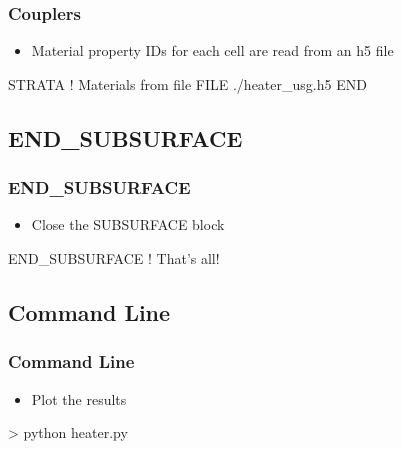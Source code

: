 \documentclass{beamer}
\newcommand\bluecomment[1]{{{\color{blue} #1}}}
\begin{document}
\begin{frame}[fragile]\frametitle{Couplers}
\begin{itemize}
  \item{Material property IDs for each cell are read from an h5 file}
\end{itemize}

\begin{semiverbatim}
STRATA \bluecomment{! Materials from file}
  FILE ./heater_usg.h5
END
\end{semiverbatim}
\end{frame}

\subsection{END\_SUBSURFACE}
\begin{frame}[fragile]\frametitle{END\_SUBSURFACE}

\begin{itemize}
  \item Close the SUBSURFACE block
\end{itemize}

\begin{semiverbatim}
END_SUBSURFACE \bluecomment{! That's all!}
\end{semiverbatim}
\end{frame}

\subsection{Command Line}
\begin{frame}[fragile]\frametitle{Command Line}

\begin{itemize}
  \item Plot the results
\end{itemize}

\begin{semiverbatim}
> python heater.py
\end{semiverbatim}

\end{frame}

\end{document}
